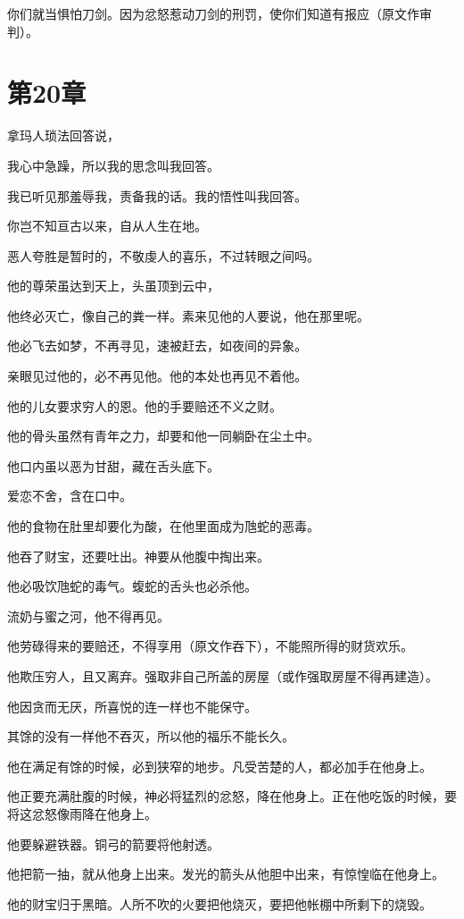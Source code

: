 \documentclass[12pt,oneside]{book}
\begin{document}
你们就当惧怕刀剑。因为忿怒惹动刀剑的刑罚，使你们知道有报应（原文作审判）。


\chapter{第20章}
拿玛人琐法回答说，

我心中急躁，所以我的思念叫我回答。

我已听见那羞辱我，责备我的话。我的悟性叫我回答。

你岂不知亘古以来，自从人生在地。

恶人夸胜是暂时的，不敬虔人的喜乐，不过转眼之间吗。

他的尊荣虽达到天上，头虽顶到云中，

他终必灭亡，像自己的粪一样。素来见他的人要说，他在那里呢。

他必飞去如梦，不再寻见，速被赶去，如夜间的异象。

亲眼见过他的，必不再见他。他的本处也再见不着他。

他的儿女要求穷人的恩。他的手要赔还不义之财。

他的骨头虽然有青年之力，却要和他一同躺卧在尘土中。

他口内虽以恶为甘甜，藏在舌头底下。

爱恋不舍，含在口中。

他的食物在肚里却要化为酸，在他里面成为虺蛇的恶毒。

他吞了财宝，还要吐出。神要从他腹中掏出来。

他必吸饮虺蛇的毒气。蝮蛇的舌头也必杀他。

流奶与蜜之河，他不得再见。

他劳碌得来的要赔还，不得享用（原文作吞下），不能照所得的财货欢乐。

他欺压穷人，且又离弃。强取非自己所盖的房屋（或作强取房屋不得再建造）。

他因贪而无厌，所喜悦的连一样也不能保守。

其馀的没有一样他不吞灭，所以他的福乐不能长久。

他在满足有馀的时候，必到狭窄的地步。凡受苦楚的人，都必加手在他身上。

他正要充满肚腹的时候，神必将猛烈的忿怒，降在他身上。正在他吃饭的时候，要将这忿怒像雨降在他身上。

他要躲避铁器。铜弓的箭要将他射透。

他把箭一抽，就从他身上出来。发光的箭头从他胆中出来，有惊惶临在他身上。

他的财宝归于黑暗。人所不吹的火要把他烧灭，要把他帐棚中所剩下的烧毁。
\end{document}
